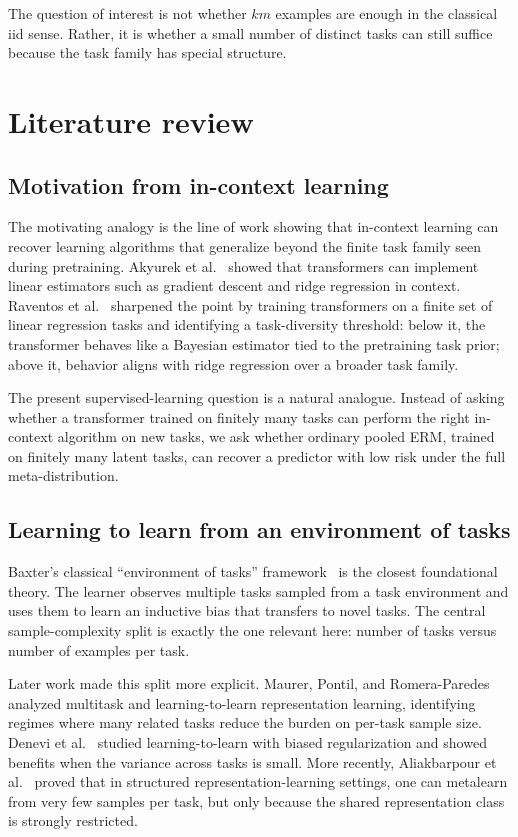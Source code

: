 \documentclass[11pt]{article}
\theoremstyle{definition}
\begin{document}
The question of interest is not whether $km$ examples are enough in the classical iid sense. Rather, it is whether a small number of distinct tasks can still suffice because the task family has special structure.

\section{Literature review}

\subsection{Motivation from in-context learning}
The motivating analogy is the line of work showing that in-context learning can recover learning algorithms that generalize beyond the finite task family seen during pretraining. Akyurek et al.~\cite{akyurek2023} showed that transformers can implement linear estimators such as gradient descent and ridge regression in context. Raventos et al.~\cite{raventos2023} sharpened the point by training transformers on a finite set of linear regression tasks and identifying a task-diversity threshold: below it, the transformer behaves like a Bayesian estimator tied to the pretraining task prior; above it, behavior aligns with ridge regression over a broader task family.

The present supervised-learning question is a natural analogue. Instead of asking whether a transformer trained on finitely many tasks can perform the right in-context algorithm on new tasks, we ask whether ordinary pooled ERM, trained on finitely many latent tasks, can recover a predictor with low risk under the full meta-distribution.

\subsection{Learning to learn from an environment of tasks}
Baxter's classical ``environment of tasks'' framework~\cite{baxter2000} is the closest foundational theory. The learner observes multiple tasks sampled from a task environment and uses them to learn an inductive bias that transfers to novel tasks. The central sample-complexity split is exactly the one relevant here: number of tasks versus number of examples per task.

Later work made this split more explicit. Maurer, Pontil, and Romera-Paredes~\cite{maurer2016} analyzed multitask and learning-to-learn representation learning, identifying regimes where many related tasks reduce the burden on per-task sample size. Denevi et al.~\cite{denevi2019} studied learning-to-learn with biased regularization and showed benefits when the variance across tasks is small. More recently, Aliakbarpour et al.~\cite{aliakbarpour2024} proved that in structured representation-learning settings, one can metalearn from very few samples per task, but only because the shared representation class is strongly restricted.
\end{document}
